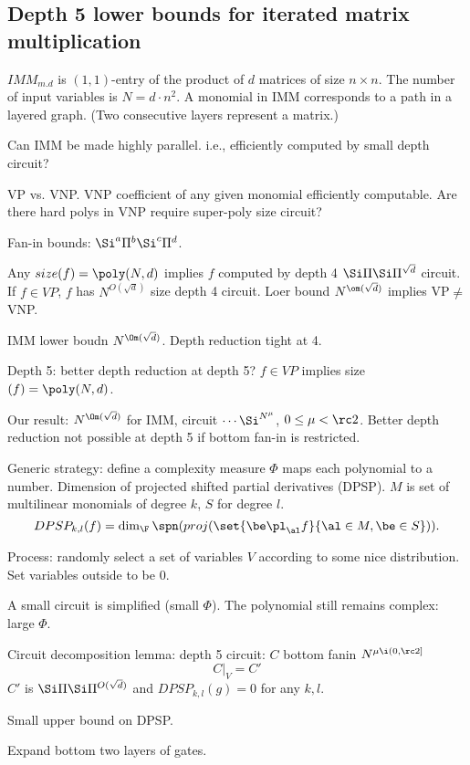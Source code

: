 \subsection{Depth 5 lower bounds for iterated matrix multiplication}


$
IMM_{m.d}
$ is $(1,1)$-entry of the product of $d$ matrices of size $n\times n$. The number of input variables is $N=d\cdot n^2$. A monomial in IMM corresponds to a path in a layered graph. (Two consecutive layers represent a matrix.) 

Can IMM be made highly parallel. i.e., efficiently computed by small depth circuit?

VP vs. VNP.  VNP coefficient of any given monomial efficiently computable. Are there hard polys in VNP require super-poly size circuit?

Fan-in bounds: $\Si^a\Pi^b\Si^c\Pi^d$.

Any $size(f)=\poly(N,d)$ implies $f$ computed by depth 4 $\Si\Pi\Si\Pi^{\sqrt d}$ circuit. 
If $f\in VP$, $f$ has $N^{O(\sqrt{d})}$ size depth 4 circuit. Loer bound $N^{\om(\sqrt d)}$ implies VP$\ne $VNP.

IMM lower boudn $N^{\Om(\sqrt d)}$. Depth reduction tight at 4.

Depth 5: better depth reduction at depth 5? $f\in VP$ implies size$(f)=\poly(N,d)$.

Our result: $N^{\Om(\sqrt d)}$ for IMM, circuit $\cdots \Si^{N^{\mu}}$, $0\le \mu <\rc2$.
Better depth reduction not possible at depth 5 if bottom fan-in is restricted.

Generic strategy: define a complexity measure $\Phi$ maps each polynomial to a number. 
Dimension of projected shifted partial derivatives (DPSP). $M$ is set of multilinear monomials of degree $k$, $S$ for degree $l$.
\[
DPSP_{k,l}(f) = \dim_{\F} \spn(proj(\set{\be \pl_\al f}{\al\in M,\be \in S})).
\]

Process: randomly select a set of variables $V$ according to some nice distribution. Set variables outside to be 0. 

A small circuit is simplified (small $\Phi$). The polynomial still remains complex: large $\Phi$.

Circuit decomposition lemma: depth 5 circuit: $C$ bottom fanin $N^{\mu\i (0,\rc2]}$
\[
C|_V=C'
\]
$C'$ is $\Si\Pi\Si\Pi^{O(\sqrt d)}$ and $DPSP_{k,l}(g)=0$ for any $k,l$.

Small upper bound on DPSP.

Expand bottom two layers of gates.

